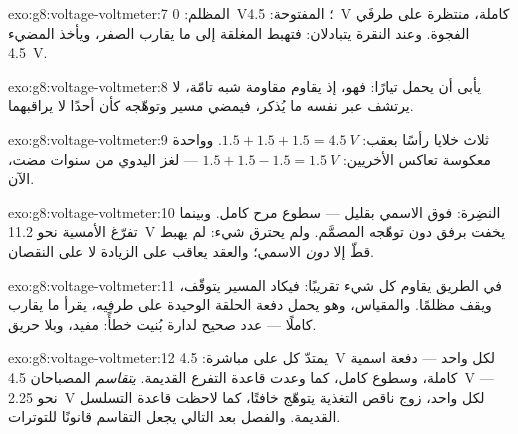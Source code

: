 \begin{solution}{exo:g8:voltage-voltmeter:7}
 المظلم: \qty{0}{V}؛  المفتوحة: \qty{4.5}{V}
كاملة، منتظرة على طرفَي الفجوة. وعند النقرة يتبادلان: فتهبط
 المغلقة إلى ما يقارب الصفر، ويأخذ  المضيء
\qty{4.5}{V}.
\end{solution}

\begin{solution}{exo:g8:voltage-voltmeter:8}
يأبى أن يحمل تيارًا: فهو، إذ يقاوم مقاومة شبه تامّة، لا يرتشف
عبر نفسه ما يُذكر، فيمضي مسير  وتوهّجه كأن أحدًا لا
يراقبهما.
\end{solution}

\begin{solution}{exo:g8:voltage-voltmeter:9}
ثلاث خلايا رأسًا بعقب: $1.5 + 1.5 + 1.5 = \qty{4.5}{V}$.
وواحدة معكوسة تعاكس الأخريين: $1.5 + 1.5 - 1.5 = \qty{1.5}{V}$
--- لغز  اليدوي من سنوات مضت،  الآن.
\end{solution}

\begin{solution}{exo:g8:voltage-voltmeter:10}
 النضِرة: فوق الاسمي بقليل --- سطوع مرح كامل. وبينما
تفرّغ الأمسية  نحو \qty{11.2}{V} يخفت  برفق دون
توهّجه المصمَّم. ولم يحترق شيء:  لم يهبط قطّ إلا
\emph{دون} الاسمي؛ والعقد يعاقب على الزيادة لا على النقصان.
\end{solution}

\begin{solution}{exo:g8:voltage-voltmeter:11}
 في الطريق يقاوم كل شيء تقريبًا: فيكاد المسير
يتوقّف، ويقف  مظلمًا. والمقياس، وهو يحمل دفعة الحلقة
الوحيدة على طرفيه، يقرأ ما يقارب   كاملًا --- عدد
صحيح لدارة بُنيت خطأً: مفيد، وبلا حريق.
\end{solution}

\begin{solution}{exo:g8:voltage-voltmeter:12}
 يمتدّ كل  على  مباشرة: \qty{4.5}{V}
لكل واحد --- دفعة اسمية كاملة، وسطوع كامل، كما وعدت قاعدة
التفرع القديمة.  \emph{يتقاسم} المصباحان
\qty{4.5}{V} --- نحو \qty{2.25}{V} لكل واحد، زوج ناقص التغذية
يتوهّج خافتًا، كما لاحظت قاعدة التسلسل القديمة. والفصل بعد
التالي يجعل التقاسم قانونًا للتوترات.
\end{solution}

